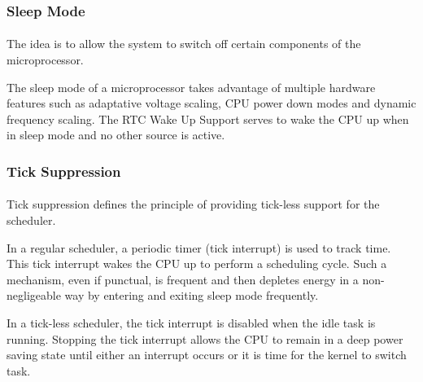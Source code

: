 \subsubsection{Sleep Mode}
\paragraph{}
The idea is to allow the system to switch off certain components of the microprocessor.

The sleep mode of a microprocessor takes advantage of multiple hardware features
    such as adaptative voltage scaling, CPU power down modes and dynamic frequency scaling.
The RTC Wake Up Support serves to wake the CPU up when in sleep mode and no other source is active.

\subsubsection{Tick Suppression}
\paragraph{}
Tick suppression defines the principle of providing tick-less support for the scheduler.

In a regular scheduler, a periodic timer (tick interrupt) is used to track time.
This tick interrupt wakes the CPU up to perform a scheduling cycle.
Such a mechanism, even if punctual, is frequent and then depletes energy in a non-negligeable way by entering and exiting sleep mode frequently.

In a tick-less scheduler, the tick interrupt is disabled when the idle task is running.
Stopping the tick interrupt allows the CPU to remain in a deep power saving state 
    until either an interrupt occurs or it is time for the kernel to switch task.

